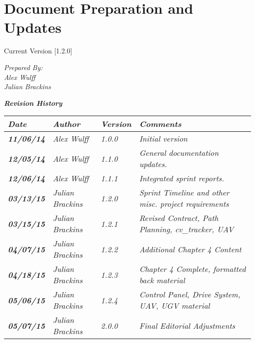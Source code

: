 
\chapter{Document Preparation and Updates}

Current Version [1.2.0]
\vspace*{5mm}

{\color{MSBlue3}
\noindent
\textit{Prepared By:}\\
\textit{Alex Wulff}\\
\textit{Julian Brackins}\\
}

\vfill
\noindent
{\color{color02} \textit{\textbf{Revision History}}}\\
\begin{tabular}{|>{\raggedright}p{1.5cm}|>{\raggedright}p{3cm}|>{\raggedright}p{1.5cm}|>{\raggedright}p{9cm}|}
\hline
\textit{\textbf{Date}} &  \textit{\textbf{Author}} & \textit{\textbf{Version}} & \textit{\textbf{Comments}}\tabularnewline
\hline
 \textit{\textbf{11/06/14}} & \textit{Alex Wulff} & \textit{1.0.0} & \textit{Initial version}\tabularnewline
\hline
\textit{\textbf{12/05/14}} & \textit{Alex Wulff} & \textit{1.1.0} & \textit{General documentation updates.}\tabularnewline
\hline
\textit{\textbf{12/06/14}} & \textit{Alex Wulff} & \textit{1.1.1} & \textit{Integrated sprint reports.}\tabularnewline
\hline
\textit{\textbf{03/13/15}} & \textit{Julian Brackins} & \textit{1.2.0} & \textit{Sprint Timeline and other misc. project requirements}\tabularnewline
\hline
\textit{\textbf{03/15/15}} & \textit{Julian Brackins} & \textit{1.2.1} & \textit{Revised Contract, Path Planning, cv\_tracker, UAV}\tabularnewline
\hline
\textit{\textbf{04/07/15}} & \textit{Julian Brackins} & \textit{1.2.2} & \textit{Additional Chapter 4 Content}\tabularnewline
\hline
\textit{\textbf{04/18/15}} & \textit{Julian Brackins} & \textit{1.2.3} & \textit{Chapter 4 Complete, formatted back material}\tabularnewline
\hline
\textit{\textbf{05/06/15}} & \textit{Julian Brackins} & \textit{1.2.4} & \textit{Control Panel, Drive System, UAV, UGV material}\tabularnewline
\hline
\textit{\textbf{05/07/15}} & \textit{Julian Brackins} & \textit{2.0.0} & \textit{Final Editorial Adjustments}\tabularnewline
\hline
\end{tabular}
\vfill

